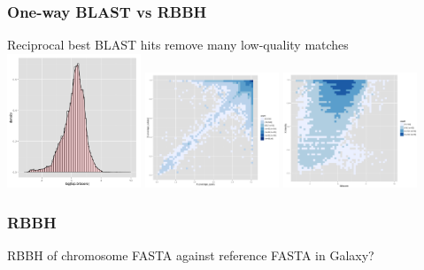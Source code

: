 \documentclass[table]{beamer}
\begin{document}
    \begin{frame}
      \frametitle{One-way BLAST vs RBBH}   
      Reciprocal best BLAST hits remove many low-quality matches
        \includegraphics[width=0.3\textwidth]{images/rbbh4}  
        \includegraphics[width=0.3\textwidth]{images/rbbh5}  
        \includegraphics[width=0.3\textwidth]{images/rbbh6}                        
    \end{frame}

    \begin{frame}
      \frametitle{RBBH}   
      RBBH of chromosome FASTA against reference FASTA in Galaxy?       

%

    \end{frame}
\end{document}
